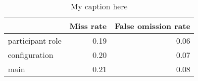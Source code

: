 \begin{table}[!ht]
\centering
\begin{tabular}{lrr}
\toprule
{} &  Miss rate &  False omission rate \\
\midrule
participant-role &       0.19 &                 0.06 \\
configuration    &       0.20 &                 0.07 \\
main             &       0.21 &                 0.08 \\
\bottomrule
\end{tabular}
\caption{My caption here}
\label{tab:unit-elements-oe-combined-errors}
\end{table}